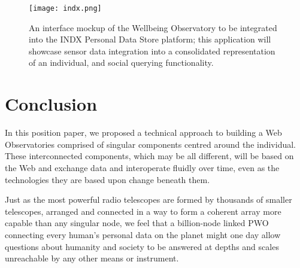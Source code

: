 \documentclass{sig-alternate}
\begin{document}
\begin{figure}
\centering
\texttt{[image: indx.png]}
\caption{An interface mockup of the Wellbeing Observatory to be integrated into the INDX Personal Data Store platform; this application will showcase sensor data integration into a consolidated representation of an individual, and social querying functionality.}\label{fig:pho}
\end{figure}

\section{Conclusion}

In this position paper, we proposed a technical approach to building a Web Observatories comprised of singular components centred around the individual.  These interconnected components, which may be all different, will be based on the Web and exchange data and interoperate fluidly over time, even as the technologies they are based upon change beneath them.  

Just as the most powerful radio telescopes are formed by thousands of smaller telescopes, arranged and connected in a way to form a coherent array  more capable than any singular node, we feel that a billion-node linked PWO connecting every human's personal data on the planet might one day allow questions about humanity and society to be answered at depths and scales unreachable by any other means or instrument.




\balancecolumns
\end{document}
